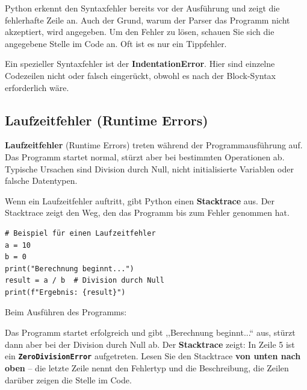 \documentclass[ngerman,11pt]{article}
\begin{document}
\noindent Python erkennt den Syntaxfehler bereits vor der Ausführung und zeigt die fehlerhafte Zeile an. Auch der Grund, warum der Parser das Programm nicht akzeptiert, wird angegeben. Um den Fehler zu lösen, schauen Sie sich die angegebene Stelle im Code an. Oft ist es nur ein Tippfehler.

Ein spezieller Syntaxfehler ist der \textbf{IndentationError}. Hier sind einzelne Codezeilen nicht oder falsch eingerückt, obwohl es nach der Block-Syntax erforderlich wäre.

\subsection{Laufzeitfehler (Runtime Errors)}

\textbf{Laufzeitfehler} (Runtime Errors) treten während der Programmausführung auf. Das Programm startet normal, stürzt aber bei bestimmten Operationen ab. Typische Ursachen sind Division durch Null, nicht initialisierte Variablen oder falsche Datentypen.

Wenn ein Laufzeitfehler auftritt, gibt Python einen \textbf{Stacktrace} aus. Der Stacktrace zeigt den Weg, den das Programm bis zum Fehler genommen hat. 

\begin{lstlisting}[caption=fehler\_runtime.py]
# Beispiel für einen Laufzeitfehler
a = 10
b = 0
print("Berechnung beginnt...")
result = a / b  # Division durch Null
print(f"Ergebnis: {result}")
\end{lstlisting}

\noindent Beim Ausführen des Programms:


\noindent Das Programm startet erfolgreich und gibt ,,Berechnung beginnt...`` aus, stürzt dann aber bei der Division durch Null ab. Der \textbf{Stacktrace} zeigt: In Zeile 5 ist ein \textbf{\texttt{ZeroDivisionError}} aufgetreten. Lesen Sie den Stacktrace \textbf{von unten nach oben} -- die letzte Zeile nennt den Fehlertyp und die Beschreibung, die Zeilen darüber zeigen die Stelle im Code.
\end{document}
